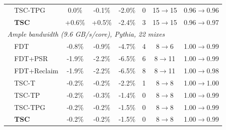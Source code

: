 \begin{tabular}{llcccccc}
& TSC-TPG & 0.0\% & -0.1\% & -2.0\% & 0 & 15$\to$15 & 0.96$\to$0.96 \\
& \textbf{TSC} & +0.6\% & +0.5\% & -2.4\% & 3 & 15$\to$15 & 0.96$\to$0.97 \\
\midrule
\multicolumn{8}{l}{\emph{Ample bandwidth (9.6 GB/s/core), Pythia, 22 mixes}} \\
& FDT & -0.8\% & -0.9\% & -4.7\% & 4 & 8$\to$6 & 1.00$\to$0.99 \\
& FDT+PSR & -1.9\% & -2.2\% & -6.5\% & 6 & 8$\to$11 & 1.00$\to$0.99 \\
& FDT+Reclaim & -1.9\% & -2.2\% & -6.5\% & 8 & 8$\to$11 & 1.00$\to$0.98 \\
& TSC-T & -0.2\% & -0.2\% & -2.2\% & 1 & 8$\to$8 & 1.00$\to$1.00 \\
& TSC-TP & -0.2\% & -0.3\% & -1.4\% & 0 & 8$\to$8 & 1.00$\to$0.99 \\
& TSC-TPG & -0.2\% & -0.2\% & -1.5\% & 0 & 8$\to$8 & 1.00$\to$0.99 \\
& \textbf{TSC} & -0.2\% & -0.2\% & -1.5\% & 0 & 8$\to$8 & 1.00$\to$0.99 \\
\bottomrule
\end{tabular}
